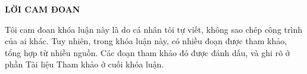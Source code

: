\documentclass[../../../thesis]{subfiles}
\begin{document}
\begin{center}
    \textbf{\large
        LỜI CAM ĐOAN
    }
\end{center}

Tôi cam đoan khóa luận này là do cá nhân tôi tự viết, không sao chép công trình
của ai khác. Tuy nhiên, trong khóa luận này, có nhiều đoạn được tham khảo, tổng
hợp từ nhiều nguồn. Các đoạn tham khảo đó được đánh dấu, và ghi rõ ở phần Tài
liệu Tham khảo ở cuối khóa luận.

\clearpage
\end{document}
